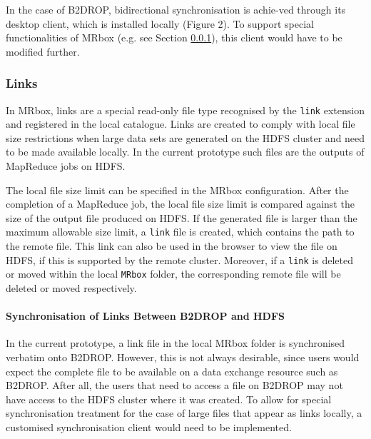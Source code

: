 In the case of B2DROP, bidirectional synchronisation is achie-ved through its desktop client, which is installed locally (Figure 2). To support special functionalities of MRbox (e.g. see Section \ref{sec:links}), this client would have to be modified further.

\subsubsection{Links}
\label{sec:links}
In MRbox, links are a special read-only file type recognised by the \texttt{link} extension and registered in the local catalogue. Links are created to comply with local file size restrictions when large data sets are generated on the HDFS cluster and need to be made available locally. In the current prototype such files are the outputs of MapReduce jobs on HDFS.

The local file size limit can be specified in the MRbox configuration. After the completion of a MapReduce job, the local file size limit is compared against  the size of the output file produced on HDFS. If the generated file is larger than the maximum allowable size limit, a \texttt{link} file is created, which contains the path to the remote file. This link can also be used in the browser to view the file on HDFS, if this is supported by the remote cluster. Moreover, if a \texttt{link} is deleted or moved within the local \texttt{MRbox} folder, the corresponding remote file will be deleted or moved respectively.

\paragraph{Synchronisation of Links Between B2DROP and HDFS}
In the current prototype, a link file in the local MRbox folder is synchronised verbatim onto B2DROP. However, this is not always desirable, since users would expect the complete file to be available on a data exchange resource such as B2DROP. After all, the users that need to access a file on B2DROP may not have access to the HDFS cluster where it was created. To allow for special synchronisation treatment for the case of large files that appear as links locally, a customised synchronisation client would need to be implemented.

